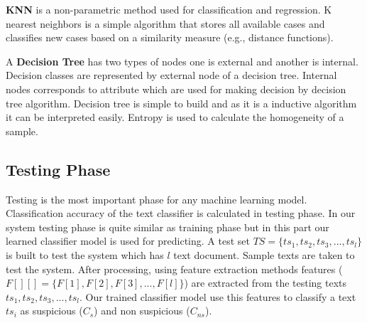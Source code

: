 \vspace{0.3cm}
\textbf{KNN}\cite{harisinghaney2014text} is a non-parametric method used for
classification and regression. K nearest neighbors is a simple algorithm that stores all available cases and classifies new cases based on a similarity measure (e.g., distance functions).

\vspace{0.3cm}
A \textbf{Decision Tree}\cite{chavan2014survey} has two types of nodes one is external and another is internal. Decision classes are represented by external node of a decision tree. Internal nodes corresponds to attribute which are used for making decision by decision tree algorithm. Decision tree is simple to build and as it is a inductive algorithm it can be interpreted easily. Entropy is used to calculate the homogeneity of a sample.

\subsection{\textbf{Testing Phase}}
Testing is the most important phase for any machine learning model. Classification accuracy of the text classifier is calculated in testing phase. In our system testing phase is quite similar as training phase but in this part our learned classifier model is used for predicting. A test set $TS =\{ts_1, ts_2, ts_3, ..., ts_l\}$ is built to test the system which has $l$ text document. Sample texts are taken to test the system. After processing, using feature extraction methods features ($F[][]=\{F[1], F[2], F[3], ... ,F[l]\}$) are extracted from the testing texts $ts_1, ts_2, ts_3, ..., ts_l$. Our trained classifier model use this features to classify a text $ts_i$ as suspicious ($C_s$) and non suspicious ($C_{ns}$).